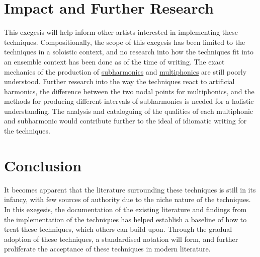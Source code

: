 \section{Impact and Further Research}
This exegesis will help inform other artists interested in implementing these techniques. 
Compositionally, the scope of this exegesis has been limited to the techniques in a soloistic context, and no research into how the techniques fit into an ensemble context has been done as of the time of writing.
The exact mechanics of the production of \hyperref[sec:subharmonics]{subharmonics} and \hyperref[sec:multiphonics]{multiphonics} are still poorly understood.
Further research into the way the techniques react to artificial harmonics, the difference between the two nodal points for multiphonics, and the methods for producing different intervals of subharmonics is needed for a holistic understanding.
The analysis and cataloguing of the qualities of each multiphonic and subharmonic would contribute further to the ideal of idiomatic writing for the techniques.


\section{Conclusion}
It becomes apparent that the literature surrounding these techniques is still in its infancy, with few sources of authority due to the niche nature of the techniques.
In this exegesis, the documentation of the existing literature and findings from the implementation of the techniques has helped establish a baseline of how to treat these techniques, which others can build upon.
Through the gradual adoption of these techniques, a standardised notation will form, and further proliferate the acceptance of these techniques in modern literature.

